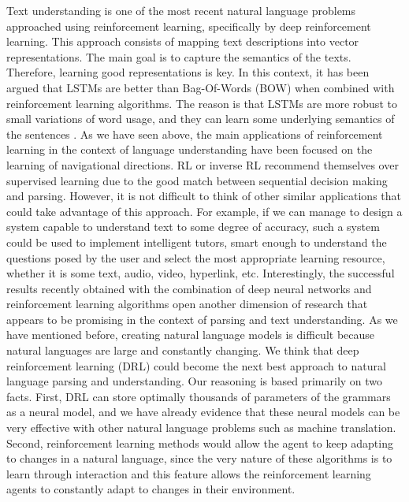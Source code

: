 Text understanding is one of the most recent natural language problems approached using reinforcement learning, specifically by deep reinforcement learning. This approach consists of mapping text descriptions into vector representations. The main goal is to capture the semantics of the texts. Therefore, learning good representations is key. In this context, it has been argued that LSTMs are better than Bag-Of-Words (BOW) when combined with reinforcement learning algorithms. The reason is that LSTMs are more robust to small variations of word usage, and they can learn some underlying semantics of the sentences .
As we have seen above, the main applications of reinforcement learning in the context of language understanding have been focused on the learning of navigational directions. RL or inverse RL recommend themselves over supervised learning due to the good match between sequential decision making and parsing. However, it is not difficult to think of other similar applications that could take advantage of this approach. For example, if we can manage to design a system capable to understand text to some degree of accuracy, such a system could be used to implement intelligent tutors, smart enough to understand the questions posed by the user and select the most appropriate learning resource, whether it is some text, audio, video, hyperlink, etc.
Interestingly, the successful results recently obtained with the combination of deep neural networks and reinforcement learning algorithms open another dimension of research that appears to be promising in the context of parsing and text understanding. As we have mentioned before, creating natural language models is difficult because natural languages are large and constantly changing. We think that deep reinforcement learning (DRL) could become the next best approach to natural language parsing and understanding. Our reasoning is based primarily on two facts. First, DRL can store optimally thousands of parameters of the grammars as a neural model, and we have already evidence that these neural models can be very effective with other natural language problems such as machine translation. Second, reinforcement learning methods would allow the agent to keep adapting to changes in a natural language, since the very nature of these algorithms is to learn through interaction and this feature allows the reinforcement learning agents to constantly adapt to changes in their environment.

